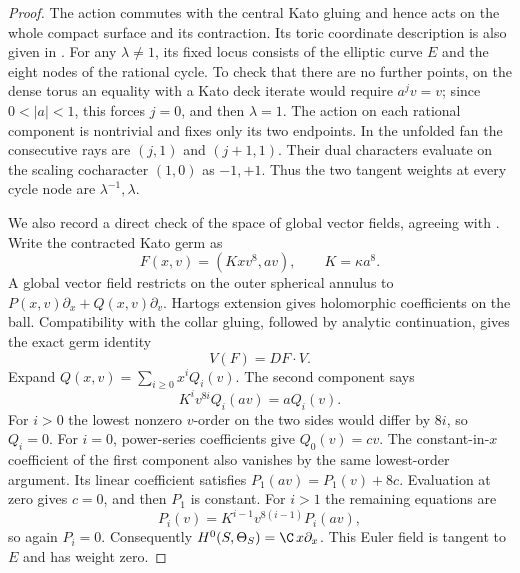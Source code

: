 \begin{proof}
The action commutes with the central Kato gluing and hence
acts on the whole compact surface and its contraction.
Its toric coordinate description is also given in
\citet[Section~2, equations~(1)--(8)]{Fujiki2009D}.
For any $\lambda\ne1$, its fixed locus consists of the elliptic
curve $E$ and the eight nodes of the rational cycle.
To check that there are no further points, on the dense torus
an equality with a Kato deck iterate would require $a^jv=v$;
since $0<|a|<1$, this forces $j=0$, and then $\lambda=1$.
The action on each rational component is nontrivial and fixes
only its two endpoints.  In the unfolded fan the consecutive
rays are $(j,1)$ and $(j+1,1)$.
Their dual characters evaluate on the scaling cocharacter
$(1,0)$ as $-1,+1$.
Thus the two tangent weights at every cycle node are
$\lambda^{-1},\lambda$.

We also record a direct check of the space of global vector
fields, agreeing with \citet[Theorem~1.1]{Fujiki2009D}.
Write the contracted Kato germ as
\[
 F(x,v)=(Kxv^8,av),\qquad K=\kappa a^8.
\]
A global vector field restricts on the outer spherical annulus
to $P(x,v)\partial_x+Q(x,v)\partial_v$.
Hartogs extension gives holomorphic coefficients on the ball.
Compatibility with the collar gluing, followed by analytic
continuation, gives the exact germ identity
\[
 V(F)=DF\cdot V.
\]
Expand $Q(x,v)=\sum_{i\ge0}x^iQ_i(v)$.
The second component says
\[
 K^iv^{8i}Q_i(av)=aQ_i(v).
\]
For $i>0$ the lowest nonzero $v$-order on the two sides would
differ by $8i$, so $Q_i=0$.
For $i=0$, power-series coefficients give $Q_0(v)=cv$.
The constant-in-$x$ coefficient of the first component also
vanishes by the same lowest-order argument.
Its linear coefficient satisfies
$P_1(av)=P_1(v)+8c$.
Evaluation at zero gives $c=0$, and then $P_1$ is constant.
For $i>1$ the remaining equations are
\[
 P_i(v)=K^{i-1}v^{8(i-1)}P_i(av),
\]
so again $P_i=0$.
Consequently $H^0(S,\Theta_S)=\C\,x\partial_x$.
This Euler field is tangent to $E$ and has weight zero.


\end{proof}
